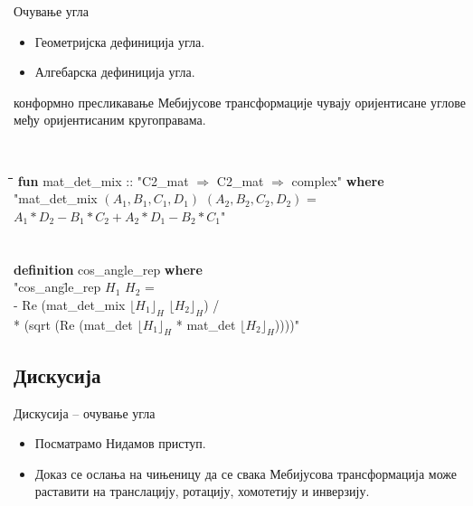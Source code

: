 \documentclass[slidestop, compress, mathserif, containsverbatim, xcolor=dvipsnames]{beamer}
\newcommand{\Repcm}[1]{\ensuremath{\lfloor#1\rfloor_{H}}}
\begin{document}
\begin{frame}{Очување угла}
  \begin{itemize}
  \item Геометријска дефиниција угла.
  \item Алгебарска дефиниција угла.
  \end{itemize}
  
  \begin{block}{конформно пресликавање}
    Мебијусове трансформације чувају оријентисане углове међу
    оријентисаним кругоправама.
  \end{block}
    
  \begin{footnotesize} {\tt
      \begin{tabbing}
        \hspace{3mm}\=\hspace{5mm}\=\hspace{5mm}\=\hspace{5mm}\=\hspace{5mm}\=\kill
        {\bf fun} mat\_det\_mix :: "{}C2\_mat $\Rightarrow$ C2\_mat $\Rightarrow$ complex" {\bf where}\\
        \> "{}mat\_det\_mix $(A_1, B_1, C_1, D_1)$ $(A_2, B_2, C_2, D_2)$ =\\
    \>\> $A_1*D_2 - B_1*C_2 + A_2*D_1 - B_2*C_1$"\\ \\ \\
      {\bf definition} cos\_angle\_rep {\bf where}\\
      \>  "{}cos\_ang\=le\_rep $H_1$ $H_2$ = \\
        \> \> - Re (mat\_det\_mix $\Repcm{H_1}$ $\Repcm{H_2}$) / \\
        \>  * (sqrt (Re (mat\_det $\Repcm{H_1}$ * mat\_det $\Repcm{H_2}$))))"
      \end{tabbing}
  } \end{footnotesize} 
 
\end{frame}

\subsection*{Дискусија}

\begin{frame}{Дискусија -- очување угла}
  \begin{itemize}
  \item Посматрамо Нидамов приступ.
  \item Доказ се ослања на чињеницу да се свака Мебијусова
    трансформација може раставити на транслацију, ротацију, хомотетију
    и инверзију.

    \begin{center}
     
   \end{center}
  \end{itemize}
\end{frame}
\end{document}
